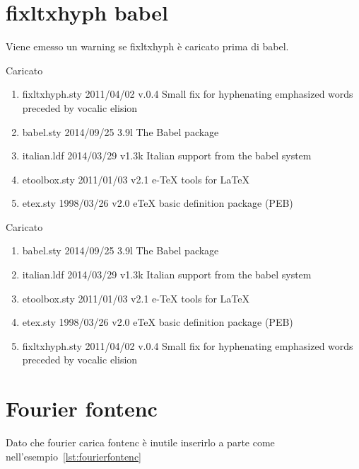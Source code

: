\section{fixltxhyph babel}
Viene emesso un warning se fixltxhyph è caricato prima di babel. 

Caricato 
\begin{enumerate}
\item fixltxhyph.sty 2011/04/02 v.0.4 Small fix for hyphenating emphasized words preceded by vocalic elision
\item babel.sty 2014/09/25 3.9l The Babel package
\item italian.ldf 2014/03/29 v1.3k Italian support from the babel system
\item etoolbox.sty 2011/01/03 v2.1 e-TeX tools for LaTeX
\item etex.sty 1998/03/26 v2.0 eTeX basic definition package (PEB)
\end{enumerate}

Caricato 
\begin{enumerate}
\item babel.sty 2014/09/25 3.9l The Babel package
\item italian.ldf 2014/03/29 v1.3k Italian support from the babel system
\item etoolbox.sty 2011/01/03 v2.1 e-TeX tools for LaTeX
\item etex.sty 1998/03/26 v2.0 eTeX basic definition package (PEB)
\item fixltxhyph.sty 2011/04/02 v.0.4 Small fix for hyphenating emphasized words preceded by vocalic elision
\end{enumerate}

\section{Fourier fontenc}
Dato che fourier carica fontenc è inutile inserirlo a parte come nell'esempio~\vref{lst:fourierfontenc}

